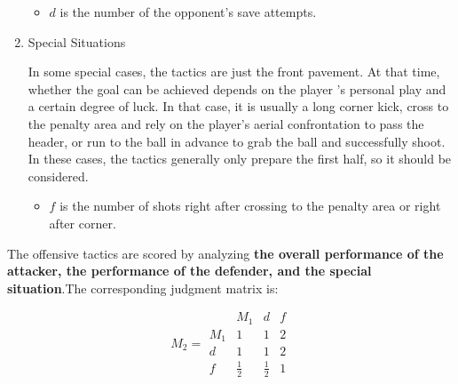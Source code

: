\documentclass{mcmthesis}
\begin{document}
\begin{enumerate}
	\begin{itemize}
		\item $d$ is the number of the opponent's save attempts.
	\end{itemize}

	\item Special Situations
	
	In some special cases, the tactics are just the front pavement. At that time, whether the goal can be achieved depends on the player ’s personal play and a certain degree of luck. In that case, it is usually a long corner kick, cross to the penalty area and rely on the player's aerial confrontation to pass the header, or run to the ball in advance to grab the ball and successfully shoot. In these cases, the tactics generally only prepare the first half, so it should be considered.

	\begin{itemize}
		\item $f$ is the number of shots right after crossing to the penalty area or right after corner.
	\end{itemize}

	\end{enumerate}
	The offensive tactics are scored by analyzing \textbf{the overall performance of the attacker, the performance of the defender, and the special situation}.The corresponding judgment matrix is:

	\begin{equation}\label{mat:2}
		M_{2}=
	  \begin{matrix}
		& M_{1} & d &f\\
   		M_{1} & 1 & 1 & 2 \\
   		d & 1 & 1 & 2 \\
   		f & \frac{1}{2} & \frac{1}{2} & 1
  	\end{matrix}
	\end{equation}
	
\end{document}
